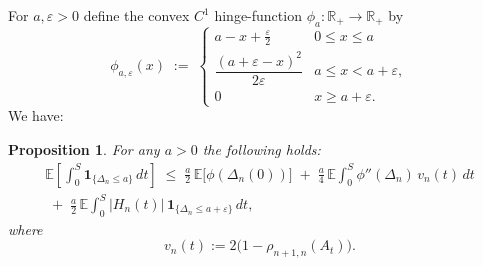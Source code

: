 \documentclass[12pt,reqno]{amsart}
\theoremstyle{plain}
\newtheorem{prop}{Proposition}[section]
\theoremstyle{definition}
\theoremstyle{remark}
\begin{document}
For \(a, \varepsilon >0\) define the convex \(C^1\) hinge-function \(\phi_a:\mathbb{R}_+\to\mathbb{R}_+\) by
\begin{equation}\label{eq:def-phi-a}
\phi_{a,\varepsilon}(x)\;:=\;
\begin{cases}
a-x+\frac{\varepsilon}{2} & 0 \le x \le a \\ 
\dfrac{(a+\varepsilon-x)^2}{2\varepsilon} & a \le x<a+\varepsilon,\\[1.2ex]
0 & x\ge a+\varepsilon.
\end{cases}
\end{equation}
We have:

\begin{prop}\label{prop:main-ineq-phi-a}
For any \(a>0\) the following holds:
\begin{multline}\label{eq:main-ineq-1-new}
\mathbb{E}\!\left[\int_0^S \mathbf{1}_{\{\Delta_n\le a\}}\,dt\right]
\;\le\;
\frac{a}{2} \,\mathbb{E}\big[\phi(\Delta_n(0))\big]
\;+\;\frac{a}{4}\,\mathbb{E}\!\int_0^S \phi''(\Delta_n)\,v_n(t)\,dt\\
\;+\; \frac{a}{2}\,\mathbb{E}\!\int_0^S |H_n(t)|\,\mathbf{1}_{\{\Delta_n\le a+\varepsilon \}}\,dt ,
\end{multline}
where 
\begin{equation}
v_n(t):=2\bigl(1-\rho_{n+1,n}(A_t)\bigr).
\end{equation}
\end{prop}
\end{document}
